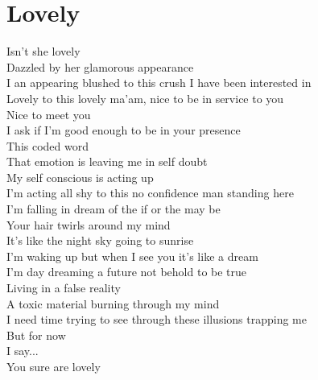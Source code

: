 \documentclass[12pt, b5paper, oneside]{book}
\begin{document}
\section{Lovely}
Isn't she lovely
\\Dazzled by her glamorous appearance
\\I an appearing blushed to this crush I have been interested in
\\Lovely to this lovely ma'am, nice to be in service to you
\\Nice to meet you
\\I ask if I'm good enough to be in your presence
\\This coded word
\\That emotion is leaving me in self doubt
\\My self conscious is acting up
\\I'm acting all shy to this no confidence man standing here
\\I'm falling in dream of the if or the may be
\\Your hair twirls around my mind
\\It's like the night sky going to sunrise
\\I'm waking up but when I see you it's like a dream
\\I'm day dreaming a future not behold to be true
\\Living in a false reality
\\A toxic material burning through my mind
\\I need time trying to see through these illusions trapping me
\\But for now
\\I say...
\\You sure are lovely 
\newpage
\end{document}
